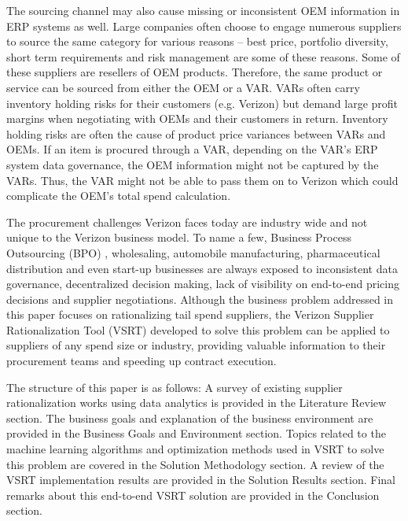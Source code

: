 \documentclass[inte,nonblindrev]{informs3} %
\begin{document}
The sourcing channel may also cause missing or inconsistent OEM information in ERP systems as well. Large companies often choose to engage numerous suppliers to source the same category for various reasons – best price, portfolio diversity, short term requirements and risk management are some of these reasons. Some of these suppliers are resellers of OEM products. Therefore, the same product or service can be sourced from either the OEM or a VAR. VARs often carry inventory holding risks for their customers (e.g. Verizon) but demand large profit margins when negotiating with OEMs and their customers in return. Inventory holding risks are often the cause of product price variances between VARs and OEMs. If an item is procured through a VAR, depending on the VAR's ERP system data governance, the OEM information might not be captured by the VARs. Thus, the VAR might not be able to pass them on to Verizon which could complicate the OEM's total spend calculation.  

The procurement challenges Verizon faces today are industry wide and not unique to the Verizon business model. To name a few, Business Process Outsourcing (BPO) \citep{r26}, wholesaling, automobile manufacturing, pharmaceutical distribution and even start-up \citep{r25} businesses are always exposed to inconsistent data governance, decentralized decision making, lack of visibility on end-to-end pricing decisions and supplier negotiations. Although the business problem addressed in this paper focuses on rationalizing tail spend suppliers, the Verizon Supplier Rationalization Tool (VSRT) developed to solve this problem can be applied to suppliers of any spend size or industry, providing valuable information to their procurement teams and speeding up contract execution.

The structure of this paper is as follows: A survey of existing supplier rationalization works using data analytics is provided in the Literature Review section. The business goals and explanation of the business environment are provided in the Business Goals and Environment section. Topics related to the machine learning algorithms and optimization methods used in VSRT to solve this problem are covered in the Solution Methodology section. A review of the VSRT implementation results are provided in the Solution Results section. Final remarks about this end-to-end VSRT solution are provided in the Conclusion section. 
\end{document}
